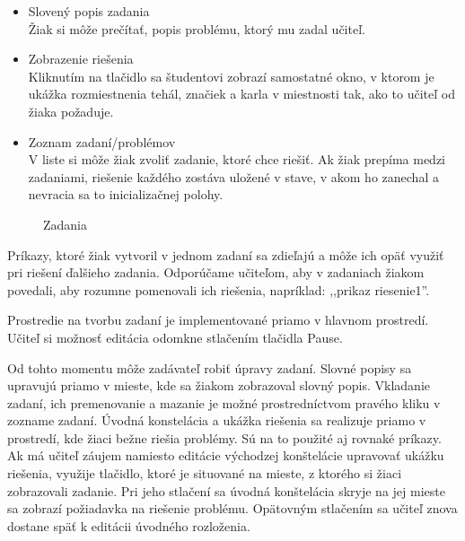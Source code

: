 \begin{itemize}
    \item Slovený popis zadania \\
Žiak si môže prečítať, popis problému, ktorý mu zadal učiteľ.
    \item Zobrazenie riešenia \\
Kliknutím na tlačidlo sa študentovi zobrazí samostatné okno, v ktorom je ukážka rozmiestnenia tehál, značiek a karla v miestnosti tak, ako to učiteľ od žiaka požaduje.
    \item Zoznam zadaní/problémov \\
V liste si môže žiak zvoliť zadanie, ktoré chce riešiť.
Ak žiak prepíma medzi zadaniami, riešenie každého zostáva uložené v stave, v akom ho zanechal a nevracia sa to inicializačnej polohy.
\end{itemize}

\begin{figure}[ht]
\centering
{}
\caption{Zadania}
\end{figure}

Príkazy, ktoré žiak vytvoril v jednom zadaní sa zdieľajú a môže ich opäť využiť pri riešení ďalšieho zadania.
Odporúčame učiteľom, aby v zadaniach žiakom povedali, aby rozumne pomenovali ich riešenia, napríklad: ,,prikaz riesenie1''.

Prostredie na tvorbu zadaní je implementované priamo v hlavnom prostredí.
Učiteľ si možnosť editácia odomkne stlačením tlačidla Pause.

Od tohto momentu môže zadávateľ robiť úpravy zadaní.
Slovné popisy sa upravujú priamo v mieste, kde sa žiakom zobrazoval slovný popis.
Vkladanie zadaní, ich premenovanie a mazanie je možné prostredníctvom pravého kliku v zozname zadaní.
Úvodná konstelácia a ukážka riešenia sa realizuje priamo v prostredí, kde žiaci bežne riešia problémy.
Sú na to použité aj rovnaké príkazy.
Ak má učiteľ záujem namiesto editácie východzej konštelácie upravovať ukážku riešenia, využije tlačidlo, ktoré je situované na mieste, z ktorého si žiaci zobrazovali zadanie.
Pri jeho stlačení sa úvodná konštelácia skryje na jej mieste sa zobrazí požiadavka na riešenie problému.
Opätovným stlačením sa učiteľ znova dostane späť k editácii úvodného rozloženia.

